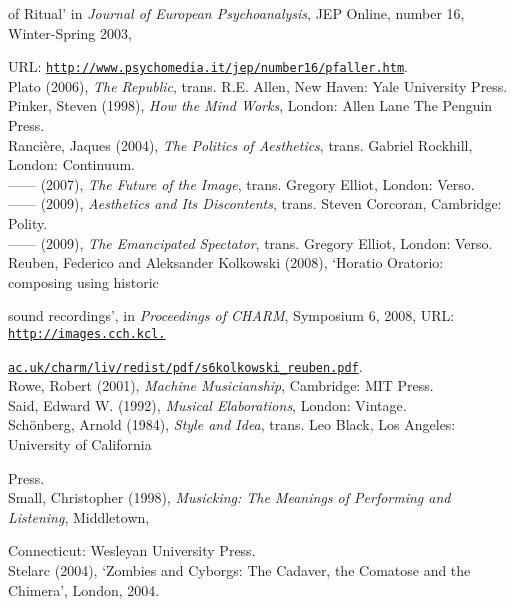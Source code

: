 of Ritual' in \emph{Journal of European Psychoanalysis}, JEP Online, number 16, Winter-Spring 2003, 

URL: \href{http://www.psychomedia.it/jep/number16/pfaller.htm}{\texttt {http://www.psychomedia.it/jep/number16/pfaller.htm}}. 
\hypertarget{plato}{}\\
Plato (2006), \emph{The Republic}, trans. R.E. Allen, New Haven: Yale University Press. 
\hypertarget{pinker}{}\\
Pinker, Steven (1998), \emph{How the Mind Works}, London: Allen Lane The Penguin Press. 
\hypertarget{ranpoli}{}\\
Ranci\`{e}re, Jaques (2004), \emph{The Politics of Aesthetics}, trans. Gabriel Rockhill, London: Continuum. 
\hypertarget{ranimg}{}\\
------ (2007), \emph{The Future of the Image}, trans. Gregory Elliot, London: Verso. 
\hypertarget{ranaesth}{}\\
------ (2009), \emph{Aesthetics and Its Discontents}, trans. Steven Corcoran, Cambridge: Polity. 
\hypertarget{ranspec}{}\\
------ (2009), \emph{The Emancipated Spectator}, trans. Gregory Elliot, London: Verso.
\hypertarget{reuben}{}\\
Reuben, Federico and Aleksander Kolkowski (2008), `Horatio Oratorio: composing using historic 

sound recordings', in \emph{Proceedings of CHARM}, Symposium 6, 2008, URL: \href{http://images.cch.kcl.ac.uk/charm/liv/redist/pdf/s6kolkowski_reuben.pdf}{\texttt{http://images.cch.kcl.}}

\href{http://images.cch.kcl.ac.uk/charm/liv/redist/pdf/s6kolkowski_reuben.pdf}{\texttt{ac.uk/charm/liv/redist/pdf/s6kolkowski\_reuben.pdf}}.
\hypertarget{rowe}{}\\
Rowe, Robert (2001), \emph{Machine Musicianship}, Cambridge: MIT Press. 
\hypertarget{said}{}\\
Said, Edward W. (1992), \emph{Musical Elaborations}, London: Vintage. 
\hypertarget{schoen}{}\\
Sch\"{o}nberg, Arnold (1984),  \emph{Style and Idea}, trans. Leo Black, Los Angeles: University of California

Press. 
\hypertarget{small}{}\\
Small, Christopher (1998), \emph{Musicking: The Meanings of Performing and Listening}, Middletown, 

Connecticut: Wesleyan University Press. 
\hypertarget{stelarc}{}\\
Stelarc (2004), `Zombies and Cyborgs: The Cadaver, the Comatose and the Chimera', London, 2004.

